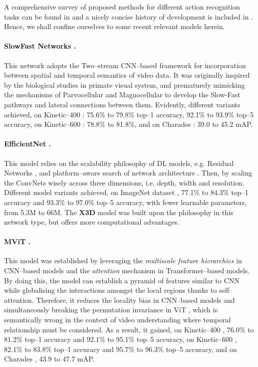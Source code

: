 \label{sec:related_work}

A comprehensive survey of proposed methods for different action recognition tasks can be found in \cite{HEO202632, KongFu2022} and a nicely concise history of development is included in \cite{shuchang2022surveyhumanactionrecognition}.
Hence, we shall confine ourselves to some recent relevant models herein.

\paragraph{SlowFast Networks \cite{feichtenhofer2019slowfast}.}
This network adopts the Two–stream CNN–based framework \cite{simonyan2014twostream} for incorporation between spatial and temporal semantics of video data.
It was originally inspired by the biological studies in primate visual system, and prematurely mimicking the mechanisms of Parvocellular and Magnocellular to develop the Slow-Fast pathways and lateral connections between them.
Evidently, different variants achieved, on Kinetic–400 \cite{kay2017kinetics}: 75.6\% to 79.8\% top–1 accuracy, 92.1\% to 93.9\% top–5 accuracy, on Kinetic–600 \cite{carreira2018shortnotekinetics600}: 78.8\% to 81.8\%, and on Charades \cite{Charades}: 39.0 to 45.2 mAP.

\paragraph{EfficientNet \cite{tan2019efficientnet}.} This model relies on the scalability philosophy of DL models, e.g. Residual Networks \cite{ResNet}, and platform–aware search of network architecture \cite{MnasNet}.
Then, by scaling the ConvNets wisely across three dimensions, i.e. depth, width and resolution. Different model variants achieved, on ImageNet dataset \cite{Russakovsky2015}, 77.1\% to 84.3\% top–1 accuracy and 93.3\% to 97.0\% top–5 accuracy, with fewer learnable parameters, from 5.3M to 66M.
The \textbf{X3D} model was built upon the philosophy in this network type, but offers more computational advantages.

\paragraph{MViT \cite{fan2021mvit,li2022mvitv2}.} This model was established by leveraging the \textit{multiscale feature hierarchies} in CNN–based models and the \textit{attention} mechanism in Transformer–based models.
By doing this, the model can establish a pyramid of features similar to CNN while globalising the interactions amongst the local regions thanks to self–attention.
Therefore, it reduces the locality bias in CNN–based models and simultaneously breaking the permutation invariance in ViT \cite{ViT}, which is semantically wrong in the context of video understanding where temporal relationship must be considered.
As a result, it gained, on Kinetic–400 \cite{kay2017kinetics}, 76.0\% to 81.2\% top–1 accuracy and 92.1\% to 95.1\% top–5 accuracy, on Kinetic–600 \cite{carreira2018shortnotekinetics600}, 82.1\% to 83.8\% top–1 accuracy and 95.7\% to 96.3\% top–5 accuracy,
and on Charades \cite{Charades}, 43.9 to 47.7 mAP.

